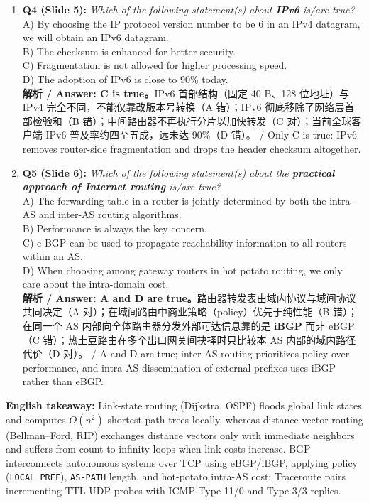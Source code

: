 \begin{enumerate}
\item \textbf{Q4 (Slide 5):} \emph{Which of the following statement(s) about \textbf{IPv6} is/are true?} \\
A) By choosing the IP protocol version number to be 6 in an IPv4 datagram, we will obtain an IPv6 datagram. \\
B) The checksum is enhanced for better security. \\
C) Fragmentation is not allowed for higher processing speed. \\
D) The adoption of IPv6 is close to 90\% today. \\
\textbf{解析 / Answer: C is true。}IPv6 首部结构（固定 40 B、128 位地址）与 IPv4 完全不同，不能仅靠改版本号转换（A 错）；IPv6 彻底移除了网络层首部检验和（B 错）；中间路由器不再执行分片以加快转发（C 对）；当前全球客户端 IPv6 普及率约四至五成，远未达 90\%（D 错）。 / Only C is true: IPv6 removes router-side fragmentation and drops the header checksum altogether.

\item \textbf{Q5 (Slide 6):} \emph{Which of the following statement(s) about the \textbf{practical approach of Internet routing} is/are true?} \\
A) The forwarding table in a router is jointly determined by both the intra-AS and inter-AS routing algorithms. \\
B) Performance is always the key concern. \\
C) e-BGP can be used to propagate reachability information to all routers within an AS. \\
D) When choosing among gateway routers in hot potato routing, we only care about the intra-domain cost. \\
\textbf{解析 / Answer: A and D are true。}路由器转发表由域内协议与域间协议共同决定（A 对）；在域间路由中商业策略（policy）优先于纯性能（B 错）；在同一个 AS 内部向全体路由器分发外部可达信息靠的是 \textbf{iBGP} 而非 eBGP（C 错）；热土豆路由在多个出口网关间抉择时只比较本 AS 内部的域内路径代价（D 对）。 / A and D are true; inter-AS routing prioritizes policy over performance, and intra-AS dissemination of external prefixes uses iBGP rather than eBGP.
\end{enumerate}

\textbf{English takeaway:} Link-state routing (Dijkstra, OSPF) floods global link states and computes $O(n^2)$ shortest-path trees locally, whereas distance-vector routing (Bellman–Ford, RIP) exchanges distance vectors only with immediate neighbors and suffers from count-to-infinity loops when link costs increase. BGP interconnects autonomous systems over TCP using eBGP/iBGP, applying policy (\texttt{LOCAL\_PREF}), \texttt{AS-PATH} length, and hot-potato intra-AS cost; Traceroute pairs incrementing-TTL UDP probes with ICMP Type 11/0 and Type 3/3 replies.


